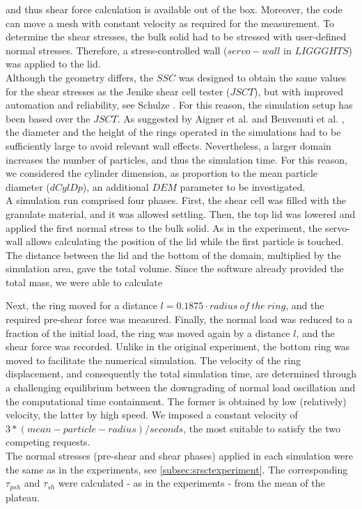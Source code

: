 \begin{appendix}
and thus shear force calculation is available out of the box. Moreover, the code can move a mesh with constant 
velocity as required for the measurement. To determine the shear stresses, the bulk solid had to be stressed with 
user-defined normal stresses. Therefore, a stress-controlled wall ($servo-wall$ in $LIGGGHTS$) was applied to the lid. \\
Although the geometry differs, the $SSC$ was designed to obtain the same values for the shear stresses as the 
Jenike shear cell tester ($JSCT$), but with improved automation and reliability,
see Schulze \cite{RefWorks:118}. 
For this reason, the simulation setup has been
based over the $JSCT$.
As suggested by Aigner et al. \cite{RefWorks:139} and Benvenuti et al. \cite{RefWorks:173}, 
the diameter and the height of the rings operated in the simulations had to be sufficiently large to avoid relevant wall effects. 
Nevertheless, a larger domain increases the number of particles, and thus the simulation time. 
For this reason, we considered the cylinder dimension, as proportion to the mean particle diameter ($dCylDp$), 
an additional $DEM$ parameter to be investigated. \\   
A simulation run comprised four phases. 
First, the shear cell was filled with the granulate material, and it was allowed
settling.
Then, the top lid was lowered and applied the first normal stress to the bulk solid. 
As in the experiment, the servo-wall allows calculating the position of the lid
while the first particle is touched. 
The distance between the lid and the bottom of the domain, multiplied by the 
simulation area, gave the total volume.
Since the software already provided the total mass, we were able to calculate

Next, the ring moved for a distance $l=0.1875 \cdot radius ~of ~the ~ring$, and the required pre-shear force was measured. 
Finally, the normal load was reduced to a fraction of the initial load, 
the ring was moved again by a distance $l$, and the shear force was recorded. 
Unlike in the original experiment, the bottom ring was moved to facilitate the numerical simulation. 
The velocity of the ring displacement, and consequently the total simulation time, are determined 
through a challenging equilibrium between the downgrading of normal load oscillation and the computational time containment. 
The former is obtained by low (relatively) velocity, the latter by high speed. We imposed a constant velocity 
of $3*(mean-particle-radius)/seconds$, the most suitable to satisfy the two competing requests. \\
The normal stresses (pre-shear and shear phases) applied in each simulation were
the same as in the experiments, see \ref{subsec:srsctexperiment}.
The corresponding $\tau_{psh}$ and $\tau_{sh}$ were calculated - as in the experiments - from the mean of the plateau.\\


\end{appendix}
